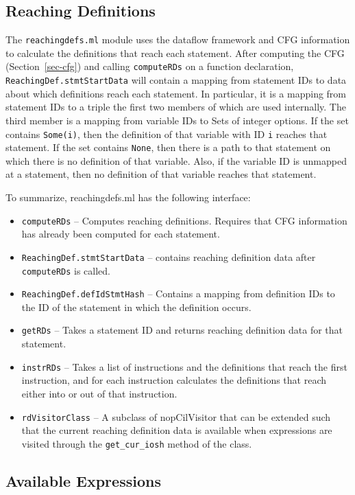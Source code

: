 \documentclass[letterpaper]{article}
\def\secref#1{Section~\ref{sec-#1}}
\def\t#1{{\tt #1}}
\begin{document}
\subsection{Reaching Definitions}

The \t{reachingdefs.ml} module uses the dataflow framework and CFG
information to calculate the definitions that reach each
statement. After computing the CFG (\secref{cfg}) and calling
\t{computeRDs} on a 
function declaration, \t{ReachingDef.stmtStartData} will contain a
mapping from statement IDs to data about which definitions reach each
statement. In particular, it is a mapping from statement IDs to a
triple the first two members of which are used internally. The third
member is a mapping from variable IDs to Sets of integer options. If
the set contains \t{Some(i)}, then the definition of that variable
with ID \t{i} reaches that statement. If the set contains \t{None},
then there is a path to that statement on which there is no definition
of that variable.  Also, if the variable ID is unmapped at a
statement, then no definition of that variable reaches that statement.

To summarize, reachingdefs.ml has the following interface:
\begin{itemize}
\item \t{computeRDs} -- Computes reaching definitions. Requires that
CFG information has already been computed for each statement.
\item \t{ReachingDef.stmtStartData} -- contains reaching
definition data after \t{computeRDs} is called.
\item \t{ReachingDef.defIdStmtHash} -- Contains a mapping
from definition IDs to the ID of the statement in which
the definition occurs.
\item \t{getRDs} -- Takes a statement ID and returns
reaching definition data for that statement.
\item \t{instrRDs} -- Takes a list of instructions and the
definitions that reach the first instruction, and for
each instruction calculates the definitions that reach
either into or out of that instruction.
\item \t{rdVisitorClass} -- A subclass of nopCilVisitor that
can be extended such that the current reaching definition
data is available when expressions are visited through
the \t{get\_cur\_iosh} method of the class.
\end{itemize}

\subsection{Available Expressions}
\end{document}
